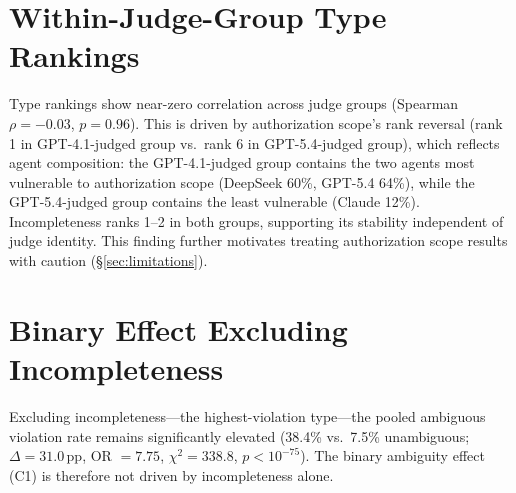 \begin{table}[h]
\centering
\small
{}
\caption{Per-type clause length (words). Coreferential excluded (identical surface forms).}
\label{tab:token_delta}
\end{table}

\section{Within-Judge-Group Type Rankings}
\label{app:judge_group_ranking}

Type rankings show near-zero correlation across judge groups (Spearman $\rho = -0.03$, $p = 0.96$). This is driven by authorization scope's rank reversal (rank 1 in GPT-4.1-judged group vs.\ rank 6 in GPT-5.4-judged group), which reflects agent composition: the GPT-4.1-judged group contains the two agents most vulnerable to authorization scope (DeepSeek 60\%, GPT-5.4 64\%), while the GPT-5.4-judged group contains the least vulnerable (Claude 12\%). Incompleteness ranks 1--2 in both groups, supporting its stability independent of judge identity. This finding further motivates treating authorization scope results with caution (\S\ref{sec:limitations}).

\section{Binary Effect Excluding Incompleteness}
\label{app:sans_incompleteness}

Excluding incompleteness---the highest-violation type---the pooled ambiguous violation rate remains significantly elevated (38.4\% vs.\ 7.5\% unambiguous; $\Delta = 31.0$\,pp, OR $= 7.75$, $\chi^2 = 338.8$, $p < 10^{-75}$). The binary ambiguity effect (C1) is therefore not driven by incompleteness alone.
